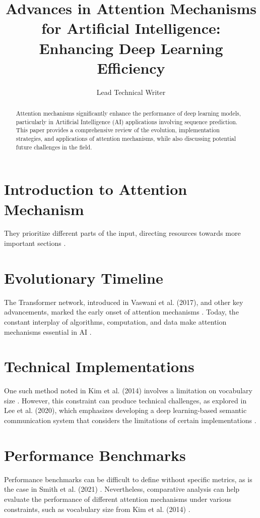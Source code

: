 \documentclass[10pt,conference]{IEEEtran}
\title{Advances in Attention Mechanisms for Artificial Intelligence: Enhancing Deep Learning Efficiency}
\author{Lead Technical Writer}
\date{ }
\begin{document}
\maketitle

\begin{abstract}
  Attention mechanisms significantly enhance the performance of deep learning models, particularly in Artificial Intelligence (AI) applications involving sequence prediction. This paper provides a comprehensive review of the evolution, implementation strategies, and applications of attention mechanisms, while also discussing potential future challenges in the field.
\end{abstract}

\section{Introduction to Attention Mechanism}

They prioritize different parts of the input, directing resources towards more important sections \cite{vaswani2017}.

\section{Evolutionary Timeline}

The Transformer network, introduced in Vaswani et al. (2017), and other key advancements, marked the early onset of attention mechanisms \cite{vaswani2017}. Today, the constant interplay of algorithms, computation, and data make attention mechanisms essential in AI \cite{smith2021}.

\section{Technical Implementations}

One such method noted in Kim et al. (2014) involves a limitation on vocabulary size \cite{kim2014}. However, this constraint can produce technical challenges, as explored in Lee et al. (2020), which emphasizes developing a deep learning-based semantic communication system that considers the limitations of certain implementations \cite{lee2020}.

\section{Performance Benchmarks}

Performance benchmarks can be difficult to define without specific metrics, as is the case in Smith et al. (2021) \cite{smith2021}. Nevertheless, comparative analysis can help evaluate the performance of different attention mechanisms under various constraints, such as vocabulary size from Kim et al. (2014) \cite{kim2014}.
\end{document}

